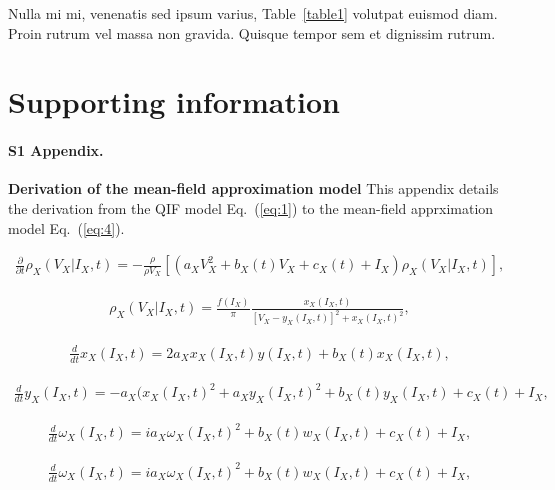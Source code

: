 \documentclass[10pt,letterpaper]{article}
\begin{document}
Nulla mi mi, venenatis sed ipsum varius, Table~\ref{table1} volutpat euismod diam. Proin rutrum vel massa non gravida. Quisque tempor sem et dignissim rutrum. 

\section*{Supporting information}


\paragraph*{S1 Appendix.}
\label{S1_Appendix}
{\bf Derivation of the mean-field approximation model} This appendix details the derivation from the QIF model Eq.~(\ref{eq:1}) to the mean-field apprximation model Eq.~(\ref{eq:4}).

\begin{eqnarray}
\label{eq:6}
    \frac{\partial}{\partial t}\rho_{X}(V_{X}|I_{X},t)=-\frac{\rho}{\rho V_{X}}\left[ \left( a_{X}V_{X}^{2} + b_{X}(t)V_{X} + c_{X}(t) + I_{X}\right) \rho_{X}(V_{X}|I_{X},t) \right],
\end{eqnarray}

\begin{eqnarray}
\label{eq:7}
    \rho_{X}(V_{X}|I_{X},t) = \frac{f(I_{X})}{\pi}\frac{x_{X}(I_{X},t)}{\left[ V_{X}-y_{X}(I_{X},t)\right]^{2} + x_{X}(I_{X},t)^{2}},
\end{eqnarray}

\begin{eqnarray}
\label{eq:8}
    \frac{d}{dt}x_{X}(I_{X},t) = 2a_{X}x_{X}(I_{X},t)y(I_{X},t) + b_{X}(t)x_{X}(I_{X},t),
\end{eqnarray}

\begin{eqnarray}
\label{eq:9}
    \frac{d}{dt}y_{X}(I_{X},t) = -a_{X}(x_{X}(I_{X},t)^{2} + a_{X}y_{X}(I_{X},t)^{2} + b_{X}(t)y_{X}(I_{X},t) + c_{X}(t) + I_{X},
\end{eqnarray}

\begin{eqnarray}
\label{eq:10}
    \frac{d}{dt}\omega_{X}(I_{X},t) = ia_{X}\omega_{X}(I_{X},t)^{2} + b_{X}(t)w_{X}(I_{X},t) + c_{X}(t) + I_{X},
\end{eqnarray}

\begin{eqnarray}
\label{eq:11}
    \frac{d}{dt}\omega_{X}(I_{X},t) = ia_{X}\omega_{X}(I_{X},t)^{2} + b_{X}(t)w_{X}(I_{X},t) + c_{X}(t) + I_{X},
\end{eqnarray}
\end{document}
